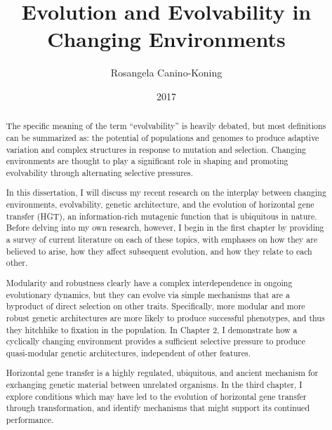 \documentclass[PhD]{msu-thesis}
\title{Evolution and Evolvability in Changing Environments}
\author{Rosangela Canino-Koning}
\date{2017}
\begin{document}
\frontmatter
%
\maketitlepage
%

\begin{abstract}
The specific meaning of the term ``evolvability'' is heavily debated, but most definitions can be summarized as: the potential of populations and genomes to produce adaptive variation and complex structures in response to mutation and selection. 
Changing environments are thought to play a significant role in shaping and promoting evolvability through alternating selective pressures.

In this dissertation, I will discuss my recent research on the interplay between changing environments, evolvability, genetic architecture, and the evolution of horizontal gene transfer (HGT), an information-rich mutagenic function that is ubiquitous in nature. Before delving into my own research, however, I begin in the first chapter by providing a survey of current literature on each of these topics, with emphases on how they are believed to arise, how they affect subsequent evolution, and how they relate to each other.

Modularity and robustness clearly have a complex interdependence in ongoing evolutionary dynamics, but they can evolve via simple mechanisms that are a byproduct of direct selection on other traits. Specifically, more modular and more robust genetic architectures are more likely to produce successful phenotypes, and thus they hitchhike to fixation in the population. In Chapter 2, I demonstrate how a cyclically changing environment provides a sufficient selective pressure to produce quasi-modular genetic architectures, independent of other features.

Horizontal gene transfer is a highly regulated, ubiquitous, and ancient mechanism for exchanging genetic material between unrelated organisms. In the third chapter, I explore conditions which may have led to the evolution of horizontal gene transfer through transformation, and identify mechanisms that might support its continued performance.  


\end{abstract}
\end{document}
